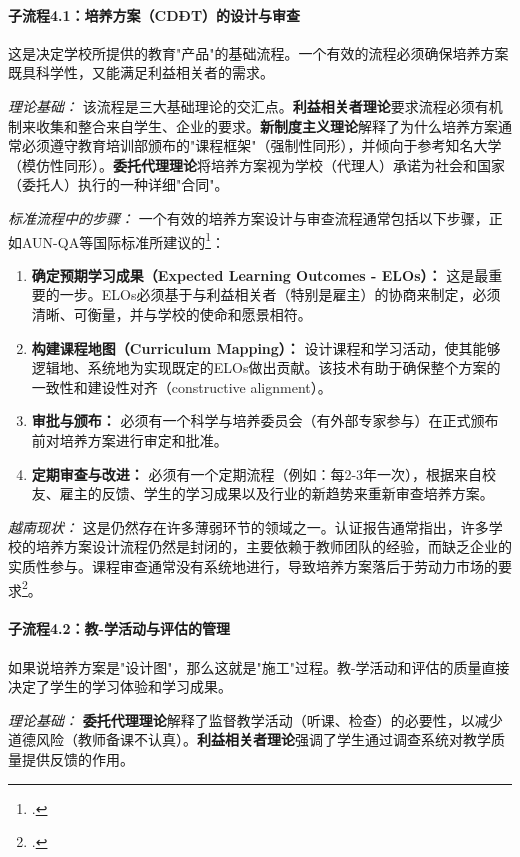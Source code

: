 \paragraph{子流程4.1：培养方案（CDĐT）的设计与审查}
这是决定学校所提供的教育"产品"的基础流程。一个有效的流程必须确保培养方案既具科学性，又能满足利益相关者的需求。

\textit{理论基础：} 该流程是三大基础理论的交汇点。\textbf{利益相关者理论}要求流程必须有机制来收集和整合来自学生、企业的要求。\textbf{新制度主义理论}解释了为什么培养方案通常必须遵守教育培训部颁布的"课程框架"（强制性同形），并倾向于参考知名大学（模仿性同形）。\textbf{委托代理理论}将培养方案视为学校（代理人）承诺为社会和国家（委托人）执行的一种详细"合同"。

\textit{标准流程中的步骤：} 一个有效的培养方案设计与审查流程通常包括以下步骤，正如AUN-QA等国际标准所建议的\footcite{AUN-QAGuide}：
\begin{enumerate}
    \item \textbf{确定预期学习成果（Expected Learning Outcomes - ELOs）：} 这是最重要的一步。ELOs必须基于与利益相关者（特别是雇主）的协商来制定，必须清晰、可衡量，并与学校的使命和愿景相符。
    \item \textbf{构建课程地图（Curriculum Mapping）：} 设计课程和学习活动，使其能够逻辑地、系统地为实现既定的ELOs做出贡献。该技术有助于确保整个方案的一致性和建设性对齐（constructive alignment）。
    \item \textbf{审批与颁布：} 必须有一个科学与培养委员会（有外部专家参与）在正式颁布前对培养方案进行审定和批准。
    \item \textbf{定期审查与改进：} 必须有一个定期流程（例如：每2-3年一次），根据来自校友、雇主的反馈、学生的学习成果以及行业的新趋势来重新审查培养方案。
\end{enumerate}

\textit{越南现状：} 这是仍然存在许多薄弱环节的领域之一。认证报告通常指出，许多学校的培养方案设计流程仍然是封闭的，主要依赖于教师团队的经验，而缺乏企业的实质性参与。课程审查通常没有系统地进行，导致培养方案落后于劳动力市场的要求\footcite{CommonFailureCriteria}。

\paragraph{子流程4.2：教-学活动与评估的管理}
如果说培养方案是"设计图"，那么这就是"施工"过程。教-学活动和评估的质量直接决定了学生的学习体验和学习成果。

\textit{理论基础：} \textbf{委托代理理论}解释了监督教学活动（听课、检查）的必要性，以减少道德风险（教师备课不认真）。\textbf{利益相关者理论}强调了学生通过调查系统对教学质量提供反馈的作用。

